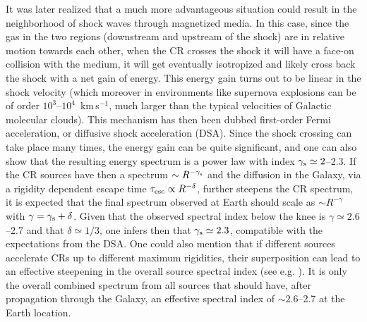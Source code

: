 \documentclass[twoside,12pt]{article}
\begin{document}
It was later realized \cite{ax77,kr77,be78,bl78} that a much more advantageous situation could result in the neighborhood of shock waves through magnetized media. In this case, since the gas in the two regions (downstream and upstream of the shock) are in relative motion towards each other, when the CR crosses the shock it will have a face-on collision with the medium, it will get eventually isotropized and likely cross back the shock with a net gain of energy. This energy gain turns out to be linear in the shock velocity (which moreover in environments like supernova explosions can be of order $10^3$--$10^4$~km\,s$^{-1}$,  much larger than the typical velocities of Galactic molecular clouds). This mechanism has then been dubbed first-order Fermi acceleration, or diffusive shock acceleration (DSA). Since the shock  crossing can take place many times, the energy gain can be quite significant, and  one can also show that the resulting energy spectrum is a power law with index $\gamma_{\rm s}\simeq 2$--2.3.
If the CR sources have then a spectrum $\sim R^{-\gamma_{\rm s}}$ and the diffusion in the Galaxy, via a rigidity dependent escape time $\tau_{\rm esc}\propto R^{-\delta}$, further steepens the CR spectrum, it is expected that the final spectrum observed at Earth should scale as $\sim R^{-\gamma}$ with $\gamma=\gamma_{\rm s}+\delta$. Given that the observed spectral index below the knee is $\gamma\simeq 2.6$--2.7 and that $\delta\simeq 1/3$, one infers then that $\gamma_{\rm s}\simeq 2.3$, compatible with the expectations from the DSA.
One could also mention that if  different sources accelerate CRs up to different maximum rigidities, their superposition can  lead to an effective steepening in the overall source spectral index (see e.g. \cite{pt10}). It is only the overall combined  spectrum from all sources that should have, after propagation through the Galaxy, an effective spectral index of $\sim 2.6$--2.7 at the Earth location.  
\end{document}
